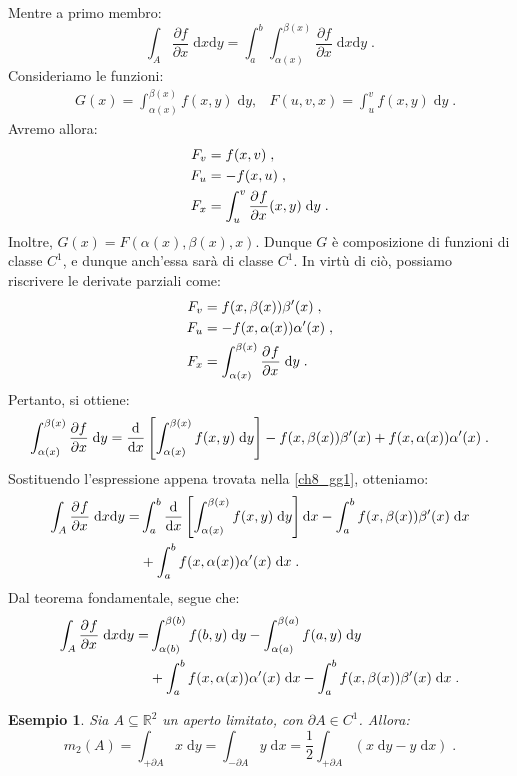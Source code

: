 \documentclass[a4paper,12pt]{report}
\theoremstyle{plain}
\newtheorem{exm}{Esempio}[section]
\theoremstyle{definition}
\theoremstyle{remark}
\newcommand{\diff}[1]{\mathrm{d}#1}
\newcommand{\pdev}[3][]{\frac{\partial^{#1}#2}{\partial #3^{#1}}}
\numberwithin{equation}{section}
\begin{document}
Mentre a primo membro:
\begin{equation}
\int_A\frac{\partial f}{\partial x}\;\diff{x}\diff{y}=\int_a^b\int_{\alpha(x)}^{\beta(x)}\frac{\partial f}{\partial x}\;\diff{x}\diff{y}\;.\label{ch8_gg1}
\end{equation}
Consideriamo le funzioni:
\begin{align}
&G(x)=\int_{\alpha(x)}^{\beta(x)}f(x,y)\;\diff{y}, & F(u,v,x)=\int_u^v f(x,y)\;\diff{y}\;.
\end{align}
Avremo allora:
\begin{align}
F_v &= f(x,v)\;, \notag \\
F_u &= -f(x,u)\;, \notag \\
F_x &= \int_u^v \pdev{f}{x}(x,y)\;\diff{y}\;.
\end{align}
Inoltre, $G(x)=F(\alpha(x),\beta(x),x)$. Dunque $G$ è composizione di funzioni di classe $C^1$, e dunque anch'essa sarà di classe $C^1$. 
In virtù di ciò, possiamo riscrivere le derivate parziali come:
\begin{align}
F_v &= f(x,\beta(x))\beta'(x)\;, \notag \\
F_u &=-f(x,\alpha(x))\alpha'(x)\;, \notag \\
F_x &= \int_{\alpha(x)}^{\beta(x)}\pdev{f}{x}\;\diff{y}\;.
\end{align}
Pertanto, si ottiene:
\begin{equation}
\int_{\alpha(x)}^{\beta(x)}\frac{\partial f}{\partial x}\;\diff{y} =\frac{\diff}{\diff{x}}\left[\int_{\alpha(x)}^{\beta(x)} f(x,y)\;\diff{y}\right]-
f(x,\beta(x))\beta'(x)+f(x,\alpha(x))\alpha'(x)\;.
\end{equation}
Sostituendo l'espressione appena trovata nella \eqref{ch8_gg1}, otteniamo:
\begin{align}
\int_A\pdev{f}{x}\;\diff{x}\diff{y} = &\int_a^b\frac{\diff}{\diff{x}}\left[\int_{\alpha(x)}^{\beta(x)}f(x,y)\;\diff{y}\right]\diff{x}-\int_a^bf(x,\beta(x))\beta'(x)\;\diff{x} \notag \\
&+\int_a^bf(x,\alpha(x))\alpha'(x)\;\diff{x}\;.
\end{align}
Dal teorema fondamentale, segue che:
\begin{align}
\int_A\pdev{f}{x}\;\diff{x}\diff{y}= &\int_{\alpha(b)}^{\beta(b)} f(b,y)\;\diff{y}-\int_{\alpha(a)}^{\beta(a)}f(a,y)\;\diff{y} \notag \\
&+\int_a^b f(x,\alpha(x))\alpha'(x)\;\diff{x}-\int_a^b f(x,\beta(x))\beta'(x)\;\diff{x}\;.
\end{align}
\endproof
\begin{exm} Sia $A\subseteq\mathbb{R}^2$ un aperto limitato, con $\partial A\in C^1$. Allora:
\begin{equation}
m_2(A)=\int_{+\partial A}x\;\diff{y}=\int_{-\partial A}y\;\diff{x}=\frac{1}{2}\int_{+\partial A}(x\;\diff{y}-y\;\diff{x})\;.
\end{equation}
\end{exm}
\end{document}
